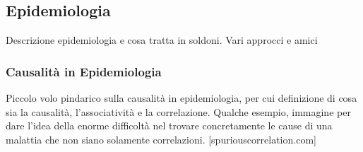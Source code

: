 \subsection{Epidemiologia}
Descrizione epidemiologia e cosa tratta in soldoni. Vari approcci e amici

\subsubsection{Causalità in Epidemiologia}
Piccolo volo pindarico sulla causalità in epidemiologia, per cui definizione di
cosa sia la causalità, l'associatività e la correlazione. Qualche esempio, immagine
per dare l'idea della enorme difficoltà nel trovare concretamente le cause di 
una malattia che non siano solamente correlazioni. [spuriouscorrelation.com]